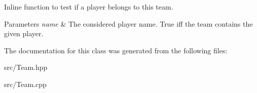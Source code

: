 Inline function to test if a player belongs to this team. 


\begin{DoxyParams}{Parameters}
{\em name} & The considered player name.  True iff the team contains the given player. \\
\hline
\end{DoxyParams}


The documentation for this class was generated from the following files\-:\begin{DoxyCompactItemize}
\item 
src/Team.\-hpp\item 
src/Team.\-cpp\end{DoxyCompactItemize}
